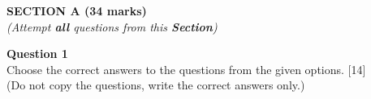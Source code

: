 \begin{center}
   \large
   \textbf{SECTION A (34 marks)}\\
   \vspace{5mm}
   \normalsize
   \textit{(Attempt \textbf{all} questions from this \textbf{Section})}
\end{center}
\par
\noindent
\textbf{Question 1}\\
Choose the correct answers to the questions from the given options. \hfill [14]\\
(Do not copy the questions, write the correct answers only.)
\par
\vspace{2mm}
